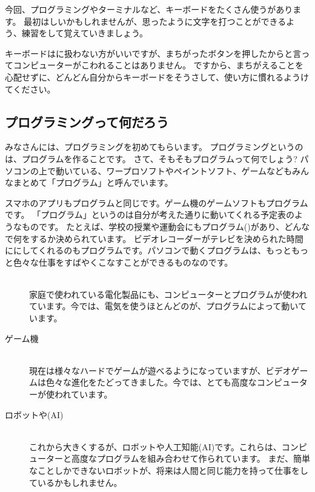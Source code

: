 今回、プログラミングやターミナルなど、キーボードをたくさん使うがあります。
最初はしいかもしれませんが、思ったように文字を打つことができるよう、練習をして覚えていきましょう。

キーボードはに扱わない方がいいですが、まちがったボタンを押したからと言ってコンピューターがこわれることはありません。
ですから、まちがえることを心配せずに、どんどん自分からキーボードをそうさして、使い方に慣れるようけてください。\clearpage


% 
% 
% 
\subsection{プログラミングって何だろう}

みなさんには、プログラミングを初めてもらいます。
プログラミングというのは、プログラムを作ることです。
さて、そもそもプログラムって何でしょう?
パソコンの上で動いている、ワープロソフトやペイントソフト、ゲームなどもみんなまとめて「プログラム」と呼んでいます。

スマホのアプリもプログラムと同じです。ゲーム機のゲームソフトもプログラムです。
「プログラム」というのは自分が考えた通りに動いてくれる予定表のようなものです。
たとえば、学校の授業や運動会にもプログラム()があり、どんなで何をするか決められています。
ビデオレコーダーがテレビを決められた時間ににしてくれるのもプログラムです。パソコンで動くプログラムは、もっともっと色々な仕事をすばやくこなすことができるものなのです。

\begin{description}
  \item[]\mbox{}\\
  家庭で使われている電化製品にも、コンピューターとプログラムが使われています。今では、電気を使うほとんどのが、プログラムによって動いています。
  \item[ゲーム機]\mbox{}\\
  現在は様々なハードでゲームが遊べるようになっていますが、ビデオゲームは色々な進化をたどってきました。今では、とても高度なコンピューターが使われています。
  \item[ロボットや(AI)]\mbox{}\\
  これから大きくするが、ロボットや人工知能(AI)です。これらは、コンピューターと高度なプログラムを組み合わせて作られています。
  まだ、簡単なことしかできないロボットが、将来は人間と同じ能力を持って仕事をしているかもしれません。
\end{description}

